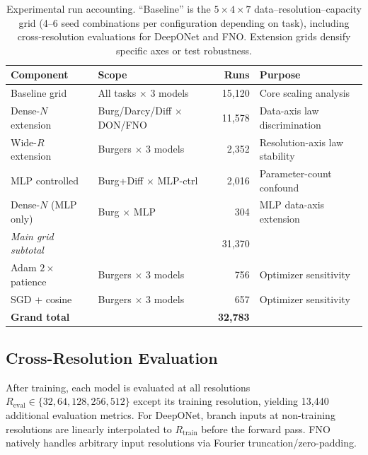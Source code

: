 \documentclass[11pt]{article}
\newcommand{\Reval}{R_{\mathrm{eval}}}
\newcommand{\Rtrain}{R_{\mathrm{train}}}
\newcommand{\totalRuns}{32{,}783}
\newcommand{\mainRuns}{31{,}370}
\begin{document}
\begin{table}[h]
\centering
\caption{Experimental run accounting. ``Baseline'' is the $5\times 4
\times 7$ data--resolution--capacity grid (4--6 seed combinations
per configuration depending on task), including cross-resolution
evaluations for DeepONet and FNO.
Extension grids densify specific axes or test
robustness.}
\label{tab:run-accounting}
\small
\begin{tabular}{@{}llrl@{}}
\toprule
\textbf{Component} & \textbf{Scope} & \textbf{Runs} &
\textbf{Purpose} \\
\midrule
Baseline grid & All tasks $\times$ 3 models & 15{,}120 &
  Core scaling analysis \\
Dense-$N$ extension & Burg/Darcy/Diff $\times$ DON/FNO & 11{,}578 &
  Data-axis law discrimination \\
Wide-$R$ extension & Burgers $\times$ 3 models & 2{,}352 &
  Resolution-axis law stability \\
MLP controlled & Burg+Diff $\times$ MLP-ctrl & 2{,}016 &
  Parameter-count confound \\
Dense-$N$ (MLP only) & Burg $\times$ MLP & 304 &
  MLP data-axis extension \\
\midrule
\emph{Main grid subtotal} & & \mainRuns{} & \\
\midrule
Adam $2\times$ patience & Burgers $\times$ 3 models & 756 &
  Optimizer sensitivity \\
SGD + cosine & Burgers $\times$ 3 models & 657 &
  Optimizer sensitivity \\
\midrule
\textbf{Grand total} & & \textbf{\totalRuns{}} & \\
\bottomrule
\end{tabular}
\end{table}

\subsection{Cross-Resolution Evaluation}
After training, each model is evaluated at all resolutions
$\Reval \in \{32, 64, 128, 256, 512\}$ except its training resolution,
yielding 13{,}440 additional evaluation metrics. For DeepONet, branch
inputs at non-training resolutions are linearly interpolated to
$\Rtrain$ before the forward pass. FNO natively handles arbitrary input
resolutions via Fourier truncation/zero-padding.
\end{document}
